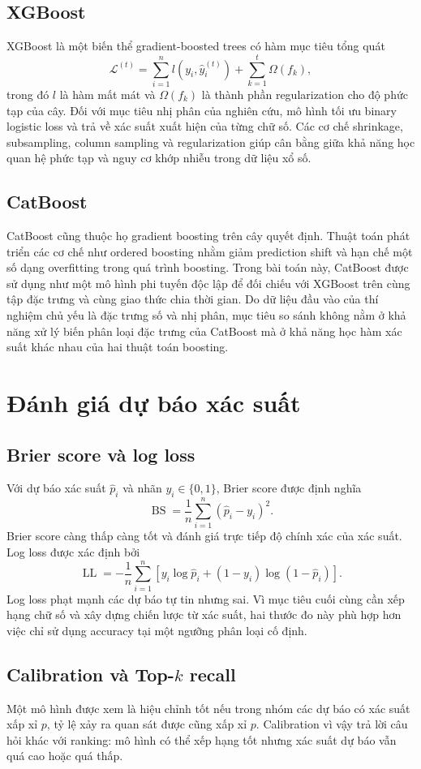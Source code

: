 \subsection{XGBoost}
XGBoost là một biến thể gradient-boosted trees có hàm mục tiêu tổng quát
\[
\mathcal L^{(t)}=\sum_{i=1}^{n}l\!\left(y_i,\hat y_i^{(t)}\right)
+\sum_{k=1}^{t}\Omega(f_k),
\]
trong đó $l$ là hàm mất mát và $\Omega(f_k)$ là thành phần regularization cho độ phức tạp của cây. Đối với mục tiêu nhị phân của nghiên cứu, mô hình tối ưu binary logistic loss và trả về xác suất xuất hiện của từng chữ số. Các cơ chế shrinkage, subsampling, column sampling và regularization giúp cân bằng giữa khả năng học quan hệ phức tạp và nguy cơ khớp nhiễu trong dữ liệu xổ số.

\subsection{CatBoost}
CatBoost cũng thuộc họ gradient boosting trên cây quyết định. Thuật toán phát triển các cơ chế như ordered boosting nhằm giảm prediction shift và hạn chế một số dạng overfitting trong quá trình boosting. Trong bài toán này, CatBoost được sử dụng như một mô hình phi tuyến độc lập để đối chiếu với XGBoost trên cùng tập đặc trưng và cùng giao thức chia thời gian. Do dữ liệu đầu vào của thí nghiệm chủ yếu là đặc trưng số và nhị phân, mục tiêu so sánh không nằm ở khả năng xử lý biến phân loại đặc trưng của CatBoost mà ở khả năng học hàm xác suất khác nhau của hai thuật toán boosting.

\section{Đánh giá dự báo xác suất}
\subsection{Brier score và log loss}
Với dự báo xác suất $\hat p_i$ và nhãn $y_i\in\{0,1\}$, Brier score được định nghĩa
\[
\operatorname{BS}=\frac{1}{n}\sum_{i=1}^{n}(\hat p_i-y_i)^2.
\]
Brier score càng thấp càng tốt và đánh giá trực tiếp độ chính xác của xác suất. Log loss được xác định bởi
\[
\operatorname{LL}=-\frac{1}{n}\sum_{i=1}^{n}\left[y_i\log\hat p_i+(1-y_i)\log(1-\hat p_i)\right].
\]
Log loss phạt mạnh các dự báo tự tin nhưng sai. Vì mục tiêu cuối cùng cần xếp hạng chữ số và xây dựng chiến lược từ xác suất, hai thước đo này phù hợp hơn việc chỉ sử dụng accuracy tại một ngưỡng phân loại cố định.

\subsection{Calibration và Top-$k$ recall}
Một mô hình được xem là hiệu chỉnh tốt nếu trong nhóm các dự báo có xác suất xấp xỉ $p$, tỷ lệ xảy ra quan sát được cũng xấp xỉ $p$. Calibration vì vậy trả lời câu hỏi khác với ranking: mô hình có thể xếp hạng tốt nhưng xác suất dự báo vẫn quá cao hoặc quá thấp.


